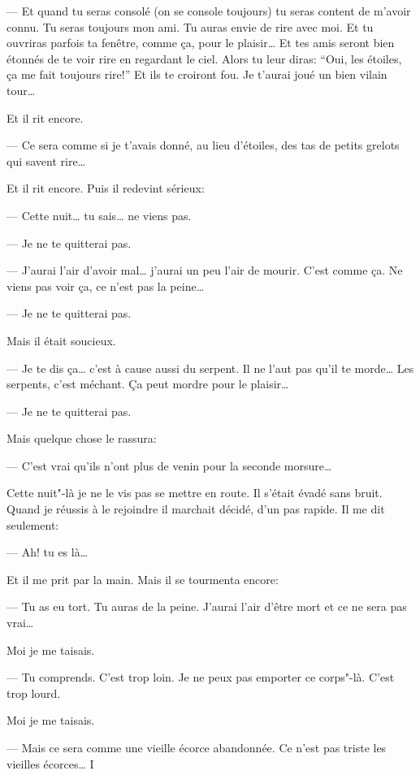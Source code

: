 --- Et quand tu seras consolé (on se console toujours) tu seras content de
m'avoir connu. Tu seras toujours mon ami. Tu auras envie de rire avec moi. Et
tu ouvriras parfois ta fenêtre, comme ça, pour le plaisir\ldots{} Et tes amis
seront bien étonnés de te voir rire en regardant le ciel. Alors tu leur diras:
``Oui, les étoiles, ça me fait toujours rire!'' Et ils te croiront fou. Je
t'aurai joué un bien vilain tour\ldots{}

Et il rit encore.

--- Ce sera comme si je t'avais donné, au lieu d'étoiles, des tas de petits
grelots qui savent rire\ldots{}

Et il rit encore. Puis il redevint sérieux:

--- Cette nuit\ldots{} tu sais\ldots{} ne viens pas.

--- Je ne te quitterai pas.

--- J'aurai l'air d'avoir mal\ldots{} j'aurai un peu l'air de mourir. C'est
comme ça. Ne viens pas voir ça, ce n'est pas la peine\ldots{}

--- Je ne te quitterai pas.

Mais il était soucieux.

--- Je te dis ça\ldots{} c’est à cause aussi du serpent. Il ne l'aut pas qu'il
te morde\ldots{} Les serpents, c'est méchant. Ça peut mordre pour le plaisir\ldots{}

--- Je ne te quitterai pas.

Mais quelque chose le rassura:

--- C'est vrai qu'ils n'ont plus de venin pour la seconde morsure\ldots{}

\medskip

Cette nuit"-là je ne le vis pas se mettre en route. Il s’était évadé sans bruit.
Quand je réussis à le rejoindre il marchait décidé, d’un pas rapide. Il me dit
seulement:

--- Ah! tu es là\ldots{}

Et il me prit par la main. Mais il se tourmenta encore:

--- Tu as eu tort. Tu auras de la peine. J'aurai l'air d'être mort et ce ne
sera pas vrai\ldots{}

Moi je me taisais.

--- Tu comprends. C'est trop loin. Je ne peux pas emporter ce corps"-là. C'est
trop lourd.

Moi je me taisais.

--- Mais ce sera comme une vieille écorce abandonnée. Ce n'est pas triste les
vieilles écorces\ldots{} I

